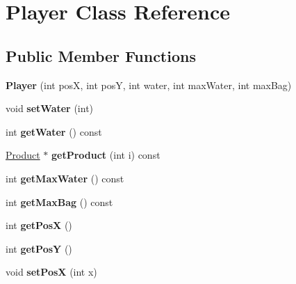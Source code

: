 \hypertarget{class_player}{}\section{Player Class Reference}
\label{class_player}
\subsection*{Public Member Functions}
\begin{DoxyCompactItemize}
\item 
\mbox{\label{class_player_a02d4e00f71b2f70b9f917e582f11aefb}} 
{\bfseries Player} (int posX, int posY, int water, int max\+Water, int max\+Bag)
\item 
\mbox{\label{class_player_af71fdee0fe8a00a06521b7c79327006f}} 
void {\bfseries set\+Water} (int)
\item 
\mbox{\label{class_player_a2b70784c09c76a98a8a2919c9b094edb}} 
int {\bfseries get\+Water} () const
\item 
\mbox{\label{class_player_a76465e55827a7e26f2b929501898f29b}} 
\mbox{\hyperlink{class_product}{Product}} $\ast$ {\bfseries get\+Product} (int i) const
\item 
\mbox{\label{class_player_a48a2e33f8cff621cac49db39f0a17b7b}} 
int {\bfseries get\+Max\+Water} () const
\item 
\mbox{\label{class_player_a305b7ce14df845b19ad0fcc8d3fc9ef0}} 
int {\bfseries get\+Max\+Bag} () const
\item 
\mbox{\label{class_player_a63ac36d64eb946cdcf32738b6e562861}} 
int {\bfseries get\+PosX} ()
\item 
\mbox{\label{class_player_ac7417b01f2400f86fbe094ccb4a9bf5e}} 
int {\bfseries get\+PosY} ()
\item 
\mbox{\label{class_player_a87d2b1a1febdf144da490041392fa740}} 
void {\bfseries set\+PosX} (int x)
\item 
\mbox{\label{class_player_ad3ae76dabc09c107af39b1e954fb4055}} 

\end{DoxyCompactItemize}
